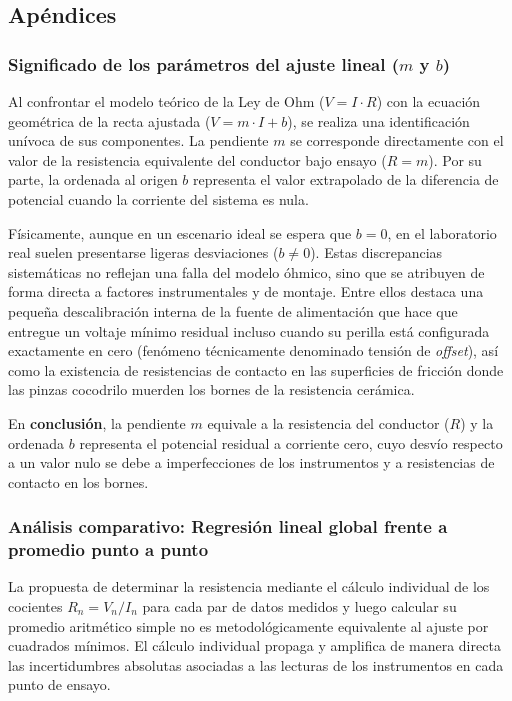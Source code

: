 \subsection{Apéndices}
\label{subsec:apendices}

\subsubsection{Significado de los parámetros del ajuste lineal ($m$ y $b$)}
\label{subsubsec:significado-parametros-ajuste-lineal}
Al confrontar el modelo teórico de la Ley de Ohm ($V = I \cdot R$) con la ecuación geométrica de la recta ajustada ($V = m \cdot I + b$), se realiza una identificación unívoca de sus componentes. La pendiente $m$ se corresponde directamente con el valor de la resistencia equivalente del conductor bajo ensayo ($R = m$). Por su parte, la ordenada al origen $b$ representa el valor extrapolado de la diferencia de potencial cuando la corriente del sistema es nula. 

Físicamente, aunque en un escenario ideal se espera que $b = 0$, en el laboratorio real suelen presentarse ligeras desviaciones ($b \neq 0$). Estas discrepancias sistemáticas no reflejan una falla del modelo óhmico, sino que se atribuyen de forma directa a factores instrumentales y de montaje. Entre ellos destaca una pequeña descalibración interna de la fuente de alimentación que hace que entregue un voltaje mínimo residual incluso cuando su perilla está configurada exactamente en cero (fenómeno técnicamente denominado tensión de \textit{offset}), así como la existencia de resistencias de contacto en las superficies de fricción donde las pinzas cocodrilo muerden los bornes de la resistencia cerámica.

En \textbf{conclusión}, la pendiente $m$ equivale a la resistencia del conductor ($R$) y la ordenada $b$ representa el potencial residual a corriente cero, cuyo desvío respecto a un valor nulo se debe a imperfecciones de los instrumentos y a resistencias de contacto en los bornes.

\subsubsection{Análisis comparativo: Regresión lineal global frente a promedio punto a punto}\label{subsubsec:comparacion-regresion-lineal-vs-promedio-punto-a-punto}
La propuesta de determinar la resistencia mediante el cálculo individual de los cocientes $R_n = V_n / I_n$ para cada par de datos medidos y luego calcular su promedio aritmético simple no es metodológicamente equivalente al ajuste por cuadrados mínimos. El cálculo individual propaga y amplifica de manera directa las incertidumbres absolutas asociadas a las lecturas de los instrumentos en cada punto de ensayo. 

